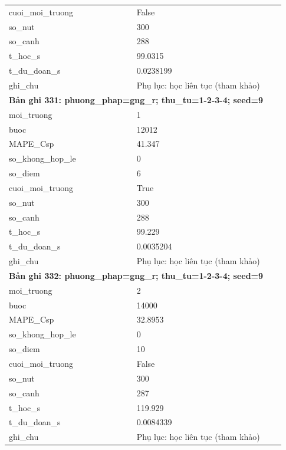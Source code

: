\begin{longtable}{p{0.43\linewidth}p{0.50\linewidth}}
cuoi\_\allowbreak moi\_\allowbreak truong & False \\
so\_\allowbreak nut & 300 \\
so\_\allowbreak canh & 288 \\
t\_\allowbreak hoc\_\allowbreak s & 99.0315 \\
t\_\allowbreak du\_\allowbreak doan\_\allowbreak s & 0.0238199 \\
ghi\_\allowbreak chu & Phụ lục: học liên tục (tham khảo) \\
\midrule
\multicolumn{2}{p{0.95\linewidth}}{\textbf{Bản ghi 331: phuong\_phap=gng\_r; thu\_tu=1-2-3-4; seed=9}} \\
moi\_\allowbreak truong & 1 \\
buoc & 12012 \\
MAPE\_\allowbreak Csp & 41.347 \\
so\_\allowbreak khong\_\allowbreak hop\_\allowbreak le & 0 \\
so\_\allowbreak diem & 6 \\
cuoi\_\allowbreak moi\_\allowbreak truong & True \\
so\_\allowbreak nut & 300 \\
so\_\allowbreak canh & 288 \\
t\_\allowbreak hoc\_\allowbreak s & 99.229 \\
t\_\allowbreak du\_\allowbreak doan\_\allowbreak s & 0.0035204 \\
ghi\_\allowbreak chu & Phụ lục: học liên tục (tham khảo) \\
\midrule
\multicolumn{2}{p{0.95\linewidth}}{\textbf{Bản ghi 332: phuong\_phap=gng\_r; thu\_tu=1-2-3-4; seed=9}} \\
moi\_\allowbreak truong & 2 \\
buoc & 14000 \\
MAPE\_\allowbreak Csp & 32.8953 \\
so\_\allowbreak khong\_\allowbreak hop\_\allowbreak le & 0 \\
so\_\allowbreak diem & 10 \\
cuoi\_\allowbreak moi\_\allowbreak truong & False \\
so\_\allowbreak nut & 300 \\
so\_\allowbreak canh & 287 \\
t\_\allowbreak hoc\_\allowbreak s & 119.929 \\
t\_\allowbreak du\_\allowbreak doan\_\allowbreak s & 0.0084339 \\
ghi\_\allowbreak chu & Phụ lục: học liên tục (tham khảo) \\

\end{longtable}
